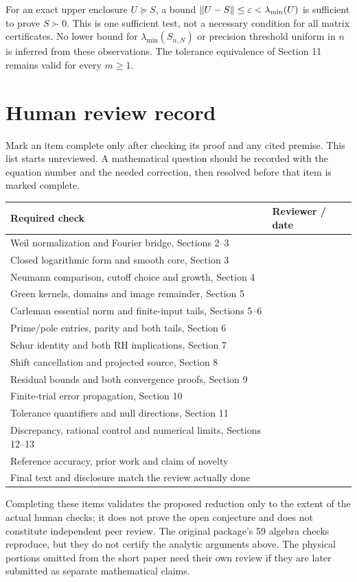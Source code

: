 For an exact upper enclosure $U\succeq S$, a bound
$\left\lVert U-S\right\rVert\le\varepsilon<\lambda_{\min}(U)$ is sufficient to prove
$S\succ0$. This is one sufficient test, not a necessary condition for all
matrix certificates. No lower bound for $\lambda_{\min}(S_{n,N})$ or
precision threshold uniform in $n$ is inferred from these observations.
The tolerance equivalence of Section 11 remains valid for every $m\ge1$.

\clearpage
\section{Human review record}
Mark an item complete only after checking its proof and any cited premise.
This list starts unreviewed. A mathematical question should be recorded
with the equation number and the needed correction, then resolved before
that item is marked complete.
\begin{center}
\begin{tabular}{p{}p{}}
\toprule
Required check & Reviewer / date\\\midrule
Weil normalization and Fourier bridge, Sections 2--3 & \hrulefill\\[7pt]
Closed logarithmic form and smooth core, Section 3 & \hrulefill\\[7pt]
Neumann comparison, cutoff choice and growth, Section 4 & \hrulefill\\[7pt]
Green kernels, domains and image remainder, Section 5 & \hrulefill\\[7pt]
Carleman essential norm and finite-input tails, Sections 5--6 & \hrulefill\\[7pt]
Prime/pole entries, parity and both tails, Section 6 & \hrulefill\\[7pt]
Schur identity and both RH implications, Section 7 & \hrulefill\\[7pt]
Shift cancellation and projected source, Section 8 & \hrulefill\\[7pt]
Residual bounds and both convergence proofs, Section 9 & \hrulefill\\[7pt]
Finite-trial error propagation, Section 10 & \hrulefill\\[7pt]
Tolerance quantifiers and null directions, Section 11 & \hrulefill\\[7pt]
Discrepancy, rational control and numerical limits, Sections 12--13 & \hrulefill\\[7pt]
Reference accuracy, prior work and claim of novelty & \hrulefill\\[7pt]
Final text and disclosure match the review actually done & \hrulefill\\[7pt]
\bottomrule
\end{tabular}
\end{center}
Completing these items validates the proposed reduction only to the extent
of the actual human checks; it does not prove the open conjecture and does
not constitute independent peer review. The original package's 59 algebra
checks reproduce, but they do not certify the analytic arguments above.
The physical portions omitted from the short paper need their own review
if they are later submitted as separate mathematical claims.


